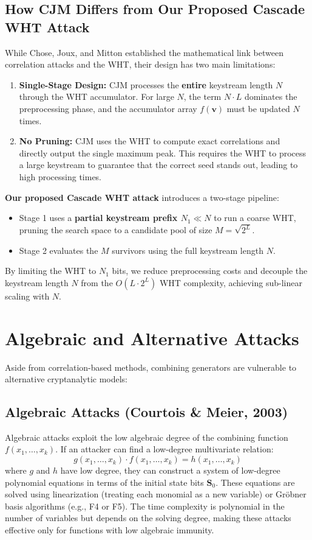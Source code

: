 \subsection{How CJM Differs from Our Proposed Cascade WHT Attack}
While Chose, Joux, and Mitton established the mathematical link between correlation attacks and the WHT, their design has two main limitations:
\begin{enumerate}
    \item \textbf{Single-Stage Design:} CJM processes the \textbf{entire} keystream length $N$ through the WHT accumulator. For large $N$, the term $N \cdot L$ dominates the preprocessing phase, and the accumulator array $f(\mathbf{v})$ must be updated $N$ times.
    \item \textbf{No Pruning:} CJM uses the WHT to compute exact correlations and directly output the single maximum peak. This requires the WHT to process a large keystream to guarantee that the correct seed stands out, leading to high processing times.
\end{enumerate}

\textbf{Our proposed Cascade WHT attack} introduces a two-stage pipeline:
\begin{itemize}
    \item Stage 1 uses a \textbf{partial keystream prefix $N_1 \ll N$} to run a coarse WHT, pruning the search space to a candidate pool of size $M = \sqrt{2^L}$.
    \item Stage 2 evaluates the $M$ survivors using the full keystream length $N$.
\end{itemize}
By limiting the WHT to $N_1$ bits, we reduce preprocessing costs and decouple the keystream length $N$ from the $O(L \cdot 2^L)$ WHT complexity, achieving sub-linear scaling with $N$.

\section{Algebraic and Alternative Attacks}
\label{sec:algebraic_attacks}

Aside from correlation-based methods, combining generators are vulnerable to alternative cryptanalytic models:

\subsection{Algebraic Attacks (Courtois \& Meier, 2003)}
Algebraic attacks \cite{courtois2003} exploit the low algebraic degree of the combining function $f(x_1, \dots, x_k)$. If an attacker can find a low-degree multivariate relation:
$$g(x_1, \dots, x_k) \cdot f(x_1, \dots, x_k) = h(x_1, \dots, x_k)$$
where $g$ and $h$ have low degree, they can construct a system of low-degree polynomial equations in terms of the initial state bits $\mathbf{S}_0$. These equations are solved using linearization (treating each monomial as a new variable) or Gröbner basis algorithms (e.g., F4 or F5). The time complexity is polynomial in the number of variables but depends on the solving degree, making these attacks effective only for functions with low algebraic immunity.

